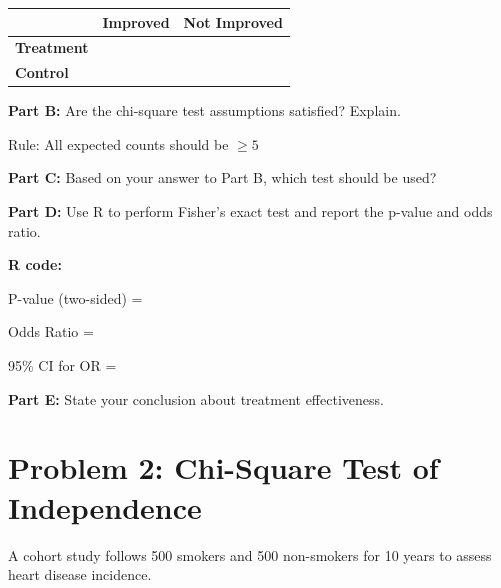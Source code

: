 \documentclass[11pt]{article}
\begin{document}
\vspace{0.3cm}

\begin{tabular}{l|cc}
& \textbf{Improved} & \textbf{Not Improved} \\
\hline
\textbf{Treatment} & & \\[1cm]
\textbf{Control} & & \\[1cm]
\end{tabular}

\vspace{1.5cm}

\textbf{Part B:} Are the chi-square test assumptions satisfied? Explain.

\vspace{0.3cm}

Rule: All expected counts should be $\geq 5$

\vspace{2.5cm}

\textbf{Part C:} Based on your answer to Part B, which test should be used?

\vspace{2.5cm}

\textbf{Part D:} Use R to perform Fisher's exact test and report the p-value and odds ratio.

\vspace{0.3cm}

\textbf{R code:}

\vspace{2cm}

P-value (two-sided) =

\vspace{1cm}

Odds Ratio =

\vspace{1cm}

95\% CI for OR =

\vspace{1cm}

\textbf{Part E:} State your conclusion about treatment effectiveness.

\vspace{3cm}

\newpage

\section{Problem 2: Chi-Square Test of Independence}

A cohort study follows 500 smokers and 500 non-smokers for 10 years to assess heart disease incidence.
\end{document}
